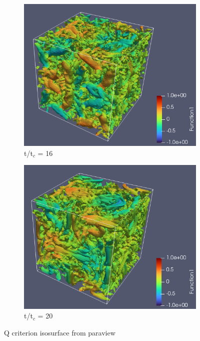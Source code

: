 \documentclass{hcmut-report}
\begin{document}
\begin{figure}[H]
     \begin{subfigure}[b]{0.35\textwidth}
         \centering
         \includegraphics[width=\textwidth]{graphics/iso016.png}
         \caption{t/t$_c$ = 16}
         \label{fig:3.1}
     \end{subfigure}
     \hspace{0.5cm}
     \begin{subfigure}[b]{0.35\textwidth}
         \centering
         \includegraphics[width=\textwidth]{graphics/iso020.png}
         \caption{t/t$_c$ = 20}
         \label{fig:3.1}
     \end{subfigure}
     \caption{Q criterion isosurface from paraview}
     \label{fig:3}
    \end{figure}
\end{document}
